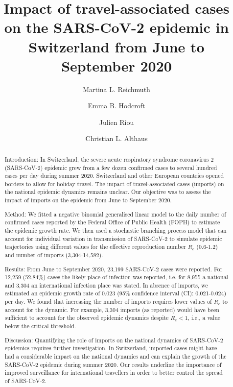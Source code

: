 \documentclass[10pt, a4paper, twoside]{article}
\title{Impact of travel-associated cases on the SARS-CoV-2 epidemic in Switzerland from June to September 2020}
\author[1]{Martina L. Reichmuth}
\author[1]{Emma B. Hodcroft}
\author[1]{Julien Riou}
\author[1*]{Christian L. Althaus}
\affil[1]{Institute of Social and Preventive Medicine, University of Bern, Bern, Switzerland}
\affil[*]{Correspondence: christian.althaus@ispm.unibe.ch}
\date{}
\begin{document}
\maketitle
\begin{abstract}
\noindent 

Introduction: In Switzerland, the severe acute respiratory syndrome coronavirus 2 (SARS-CoV-2) epidemic grew from a few dozen confirmed cases to several hundred cases per day during summer 2020. 
Switzerland and other European countries opened borders to allow for holiday travel. 
The impact of travel-associated cases (imports) on the national epidemic dynamics remains unclear. 
Our objective was to assess the impact of imports on the epidemic from June to September 2020.

Method: We fitted a negative binomial generalised linear model to the daily number of confirmed cases reported by the Federal Office of Public Health (FOPH) to estimate the epidemic growth rate. 
We then used a stochastic branching process model that can account for individual variation in transmission of SARS-CoV-2 to simulate epidemic trajectories using different values for the effective reproduction number $R_e$ (0.6-1.2) and number of imports (3,304-14,582).

Results: From June to September 2020, 23,199 SARS-CoV-2 cases were reported. 
For 12,259 (52,84\%) cases the likely place of infection was reported, i.e. for 8,955 a national and 3,304 an international infection place was stated. 
In absence of imports, we estimated an epidemic growth rate of 0.023 (95\% confidence interval (CI): 0.021-0.024) per day. 
We found that increasing the number of imports requires lower values of $R_e$ to account for the dynamic. 
For example, 3,304 imports (as reported) would have been sufficient to account for the observed epidemic dynamics despite $R_e < 1$, i.e., a value below the critical threshold.

Discussion: Quantifying the role of imports on the national dynamics of SARS-CoV-2 epidemics requires further investigation. 
In Switzerland, imported cases might have had a considerable impact on the national dynamics and can explain the growth of the SARS-CoV-2 epidemic during summer 2020. 
Our results underline the importance of improved surveillance for international travellers in order to better control the spread of SARS-CoV-2.
\clearpage
\end{abstract}
\end{document}
